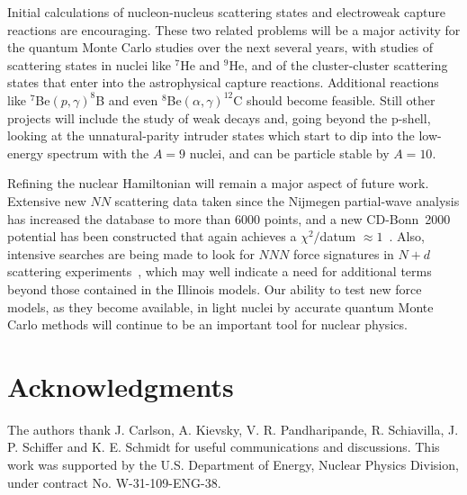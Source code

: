 Initial calculations of nucleon-nucleus scattering states and electroweak
capture reactions are encouraging.
These two related problems will be a major activity for the quantum Monte
Carlo studies over the next several years, with studies of scattering states 
in nuclei like $^7$He and $^9$He, and of the cluster-cluster scattering
states that enter into the astrophysical capture reactions.
Additional reactions like $^7$Be$(p,\gamma)^8$B and even 
$^8$Be$(\alpha,\gamma)^{12}$C should become feasible.
Still other projects will include the study of weak decays and, going 
beyond the p-shell, looking at the unnatural-parity intruder states which 
start to dip into the low-energy spectrum with the $A=9$ nuclei, and can be
particle stable by $A=10$.

Refining the nuclear Hamiltonian will remain a major aspect of future work.
Extensive new $N\!N$ scattering data taken since the Nijmegen partial-wave 
analysis has increased the database to more than 6000 points, and a new 
CD-Bonn~2000 potential has been constructed that again achieves a 
$\chi^2/$datum $\approx 1$~\cite{M01}.
Also, intensive searches are being made to look for $N\!N\!N$ force signatures
in $N+d$ scattering experiments~\cite{K+01,W+01}, which may well indicate a
need for additional terms beyond those contained in the Illinois models.
Our ability to test new force models, as they become available, in light 
nuclei by accurate quantum Monte Carlo methods will continue to be an 
important tool for nuclear physics.

\section*{Acknowledgments}

The authors thank J. Carlson, A. Kievsky, V. R. Pandharipande,
R. Schiavilla, J. P. Schiffer and K. E. Schmidt for useful communications and
discussions.  This work was supported by the U.S. Department of Energy,
Nuclear Physics Division, under contract No. W-31-109-ENG-38.

